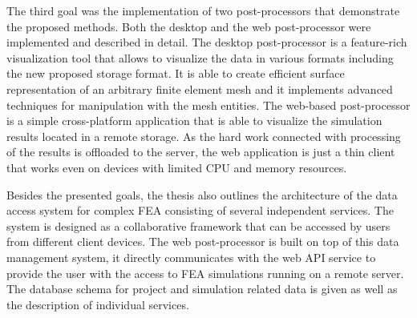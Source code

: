 The third goal was the implementation of two post-processors that demonstrate the proposed methods. Both the desktop and the web post-processor were implemented and described in detail. The desktop post-processor is a feature-rich visualization tool that allows to visualize the data in various formats including the new proposed storage format. It is able to create efficient surface representation of an arbitrary finite element mesh and it implements advanced techniques for manipulation with the mesh entities. The web-based post-processor is a simple cross-platform application that is able to visualize the simulation results located in a remote storage. As the hard work connected with processing of the results is offloaded to the server, the web application is just a thin client that works even on devices with limited CPU and memory resources.

Besides the presented goals, the thesis also outlines the architecture of the data access system for complex FEA consisting of several independent services. The system is designed as a collaborative framework that can be accessed by users from different client devices. The web post-processor is built on top of this data management system, it directly communicates with the web API service to provide the user with the access to FEA simulations running on a remote server. The database schema for project and simulation related data is given as well as the description of individual services.

